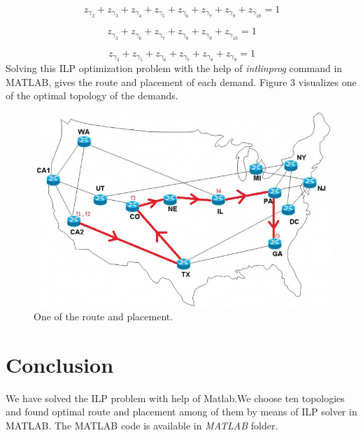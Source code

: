 \documentclass[12pt]{article}
\begin{document}
\begin{equation}	
z_{\gamma_2}+z_{\gamma_3}+z_{\gamma_4}+z_{\gamma_5}+
z_{\gamma_6}+z_{\gamma_7}+z_{\gamma_9}+z_{\gamma_{10}}		=1
\end{equation}

\begin{equation}	
z_{\gamma_3}+z_{\gamma_6}+z_{\gamma_7}+z_{\gamma_8}+
z_{\gamma_9}+z_{\gamma_{10}}		=1
\end{equation}

\begin{equation}	
z_{\gamma_3}+z_{\gamma_5}+z_{\gamma_6}+z_{\gamma_7}+
z_{\gamma_8}+z_{\gamma_9	}	=1
\end{equation}
Solving this ILP optimization problem with the help of \emph{intlinprog} command in MATLAB, gives the route and placement of each demand. Figure 3 visualizes one of the optimal topology of the demands.
\begin{figure}[t!]
\includegraphics[scale=0.7]{nsfnet1.jpg}
\caption{One of the route and placement.}
\end{figure} 
\section{Conclusion}
We have solved the ILP problem with help of Matlab.We choose ten topologies and found optimal route and placement among of them by means of ILP solver in MATLAB. The MATLAB code is available in \emph{MATLAB} folder.
\clearpage



\end{document}
